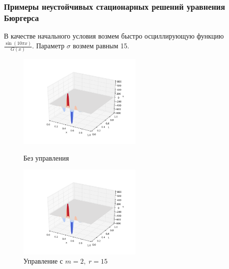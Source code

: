 \documentclass{beamer}
\begin{document}
\begin{frame}
\frametitle{Примеры неустойчивых стационарных решений уравнения Бюргерса}

В качестве начального условия возмем быстро осциллирующую функцию $\frac{\sin(10 \pi x)}{G(x)}$. Параметр $\sigma$ возмем равным 15. 



\begin{figure}[H]
\centering
\begin{minipage}{.5\textwidth}
  \centering
  \includegraphics[width=2.4in]{ex_sin10_s15}
  \caption{Без управления}
  \label{fig:test1}
\end{minipage}%
\begin{minipage}{.5\textwidth}
  \centering
  \includegraphics[width=2.4in]{re_sin10_s15}
  \caption{Управление с $m = 2, \; r = 15$}
  \label{fig:test2}
\end{minipage}
\end{figure}


\end{frame}
\end{document}
